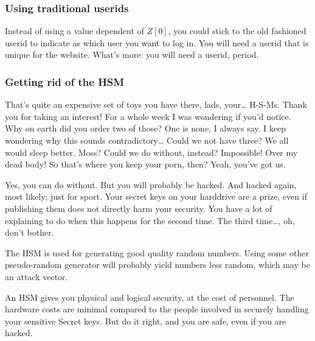 \subsubsection{Using traditional userids}
Instead of using a value dependent of $Z[0]$,
you could stick to the old fashioned userid to indicate as which user you want to log in.
You will need a userid that is unique for the website.
What's more:
you will need a userid,
period.
\subsubsection{Getting rid of the HSM}
\begin{dialogue}
		
				That's quite an expensive set of toys you have there, lads, your\ldots
				H-S-Ms.
	Thank you for taking an interest!
				For a whole week I was wondering if you'd notice.
		Why on earth did you order two of those?
	One is none, I always say.
				I keep wondering why this sounds contradictory\ldots
{}		Could we not have three? We all would sleep better. Moss?
		Could we do without, instead?
	
				Impossible!
		
				Over my dead body!
		
				So that's where you keep your porn, then?
		
				Yeah, you've got us.
\end{dialogue}
Yes, you can do without.
But you will probably be hacked.
And hacked again,
most likely;
just for sport.
Your secret keys on your harddrive are a prize,
even if publishing them does not directly harm your security.
You have a lot of explaining to do when this happens for the second time.
The third time\ldots, oh, don't bother.
\par
The HSM is used for generating good quality random numbers.
Using some other pseudo-random generator will probably yield numbers less random,
which may be an attack vector.
\par
An HSM gives you physical and logical security,
at the cost of personnel.
The hardware costs are minimal compared to the people involved in securely handling your sensitive Secret keys.
But do it right,
and you are safe,
even if you are hacked.
